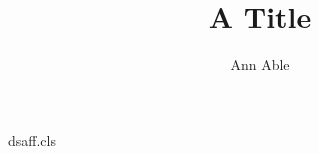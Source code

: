 \begin{filecontents*}[overwrite]{dsaff.cls}
\newcount\dsaffcount {}
\def\affiliation#1{\expandafter\protected@xdef\csname dsaff\the\dsaffcount\endcsname{#1}%
  \global\advance\dsaffcount1 }
\def\printaffil{{\count@=0 \loop\ifnum\count@<\dsaffcount
  \csname dsaff\the\count@\endcsname\par\advance\count@1 \repeat}}
\def\@maketitle{\begin{center}{\LARGE\@title\par}\vskip1em{\large\@author\par}\vskip1em
  {\small\printaffil}\end{center}}
\end{filecontents*}
\documentclass{dsaff}

\title{A Title}
\author{Ann Able}
\maketitle
Text.

